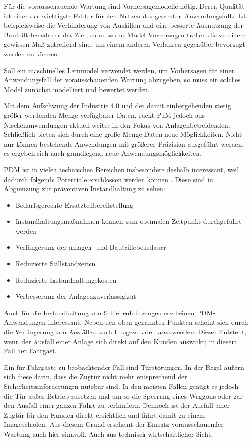 Für die vorausschauende Wartung sind Vorhersagemodelle nötig. Deren Qualität ist einer der wichtigste Faktor für den Nutzen des gesamten Anwendungsfalls. Ist beispielsweise die Verhinderung von Ausfällen und eine besserte Ausnutzung der Bauteillebensdauer das Ziel, so muss das Model Vorhersagen treffen die zu einem gewissen Maß zutreffend sind, um einem anderen Verfahren gegenüber bevorzugt werden zu können.

Soll ein maschinelles Lernmodel verwendet werden, um Vorhersagen für einen Anwendungsfall der vorausschauenden Wartung abzugeben, so muss ein solches Model zunächst modelliert und bewertet werden.


Mit dem Aufschwung der Industrie 4.0 und der damit einhergehenden stetig größer werdenden Menge verfügbarer Daten, rückt PdM jedoch aus Nischenanwendungen aktuell weiter in den Fokus von Anlagenbetreidenden. Schließlich bieten sich durch eine große Menge Daten neue Möglichkeiten. Nicht nur können bestehende Anwendungen mit größerer Präzision ausgeführt werden; es ergeben sich auch grundlegend neue Anwendungsmöglichkeiten.

PDM ist in vielen technischen Bereichen insbesondere deshalb interessant, weil  dadurch folgende Potentiale erschlossen werden können \cite[S.~31]{Holzel.2019}. Diese sind in Abgrenzung zur präventiven Instandhaltung zu sehen:
\begin{itemize}
	\item Bedarfsgerechte Ersatzteilbereitstellung
	\item Instandhaltungsmaßnahmen können zum optimalen Zeitpunkt durchgeführt werden
	\item Verlängerung der anlagen- und Bauteillebensdauer
	\item Reduzierte Stillstandzeiten
	\item Reduzierte Instandhaltungskosten
	\item Verbesserung der Anlagenzuverlässigkeit
\end{itemize}

Auch für die Instandhaltung von Schienenfahrzeugen erscheinen PDM-Anwendungen interessant. Neben den oben genannten Punkten scheint sich durch die Verringerung von Ausfällen auch Imageschaden abzuwenden. Dieser Entsteht, wenn  der Ausfall einer Anlage sich direkt auf den Kunden auswirkt; in diesem Fall der Fahrgast.

Ein für Fahrgäste zu beobachtender Fall sind Türstörungen. In der Regel äußern sich diese darin, dass die Zugtür nicht mehr entsprechend der Sicherheitsanforderungen nutzbar sind. In den meisten Fällen genügt es jedoch die Tür außer Betrieb zusetzen und um so die Sperrung eines Waggons oder gar den Ausfall einer ganzen Fahrt zu verhindern. Dennoch ist der Ausfall einer Zugtür für den Kunden direkt ersichtlich und führt damit zu einem Imageschaden. Aus diesem Grund erscheint der Einsatz vorausschauender Wartung auch hier sinnvoll. Auch aus technisch wirtschaftlicher Sicht.

